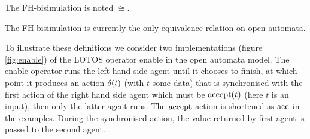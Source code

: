 \documentclass{article}
\begin{document}
\begin{noti}[FH-bisimulation]
The FH-bisimulation \cite{henrio:01055091} is noted \(\cong\).

The FH-bisimulation is currently the only equivalence relation on open automata.
\end{noti}
To illustrate these definitions we consider two implementations (figure \ref{fig:enable}) of the LOTOS \cite{ISOLOTOS} operator enable in the open automata model.
The enable operator runs  the left hand side agent until it chooses to finish, at which point it produces an action \(\delta{\left(t\right)}\) (with \(t\) some data) that is synchronised with the first action of the right hand side agent which must be \(\mathrm{accept}{\left(t\right)}\) (here \(t\) is an input), then only the latter agent runs.
The \(\mathrm{accept}\) action is shortened as \(\mathrm{acc}\) in the examples.
During the synchronised action, the value returned by first agent is passed to the second agent.
\end{document}
